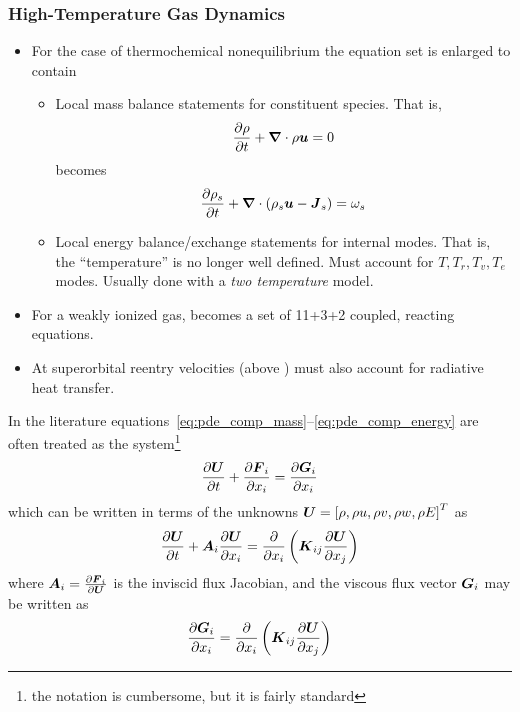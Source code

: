 \documentclass[compress,11pt]{beamer}
\begin{document}
\frame
{
  \frametitle{\scriptsize High-Temperature Gas Dynamics}
  \begin{itemize}
      
  \item For the case of thermochemical nonequilibrium the equation set is enlarged to contain
      \begin{itemize}
	\item Local mass balance statements for constituent species.  That is,
	  \begin{equation*}
	    {\frac{\partial{\rho}}{\partial{t}}} + {\boldsymbol{\nabla}} {}\cdot\rho {\boldsymbol{u}} = 0 
	  \end{equation*}
	  becomes
	  \begin{equation*}
	    {\frac{\partial{\rho_s}}{\partial{t}}} + {\boldsymbol{\nabla}} {}\cdot\left(\rho_s {\boldsymbol{u}} - {\boldsymbol{J}}_s\right) = \omega_s 
	  \end{equation*}	  
	\item Local energy balance/exchange statements for internal modes.  That is, the ``temperature'' is no longer well defined. Must account for $T,T_r,T_v,T_e$ modes.  Usually done with a \emph{two temperature} model.
      \end{itemize}
    \item For a weakly ionized gas, becomes a set of 11+3+2 coupled, reacting  equations.
    \item At superorbital reentry velocities (above ) must also account for radiative heat transfer.
	  
  \end{itemize}
}

\frame
{
  In the literature equations~\eqref{eq:pde_comp_mass}--\eqref{eq:pde_comp_energy} are often treated as the system\footnote{\tiny the notation is cumbersome, but it is fairly standard}
  \begin{equation}
    \label{eq:pde_comp}
    {\frac{\partial{{\boldsymbol{U}}}}{\partial{t}}} + {\frac{\partial{{\boldsymbol{F}}_i}}{\partial{x_i}}} = {\frac{\partial{{\boldsymbol{G}}_i}}{\partial{x_i}}}
  \end{equation}
  which can be written in terms of the unknowns ${\boldsymbol{U}}=\left[\rho, \rho u, \rho v, \rho w, \rho E\right]^T$ as
  \begin{equation}
    \label{eq:pde_comp2}
    {\frac{\partial{{\boldsymbol{U}}}}{\partial{t}}} + {\boldsymbol{A}}_i {\frac{\partial{{\boldsymbol{U}}}}{\partial{x_i}}} =
    {\frac{\partial{}}{\partial{x_i}}} \left( {\boldsymbol{K}}_{ij} {\frac{\partial{{\boldsymbol{U}}}}{\partial{x_j}}} \right)
  \end{equation}
  where ${\boldsymbol{A}}_i = {\frac{\partial{{\boldsymbol{F}}_i}}{\partial{{\boldsymbol{U}}}}}$ is the inviscid flux Jacobian, and the viscous flux vector ${\boldsymbol{G}}_i$ may be written as
  \begin{equation}
    \label{eq:viscous_flux_jacobian}
    {\frac{\partial{{\boldsymbol{G}}_i}}{\partial{x_i}}} = {\frac{\partial{}}{\partial{x_i}}} \left( {\boldsymbol{K}}_{ij} {\frac{\partial{{\boldsymbol{U}}}}{\partial{x_j}}} \right)
  \end{equation}
  \normalsize
}
\end{document}

